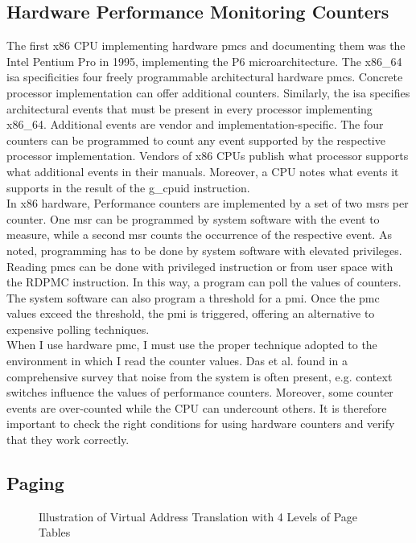 \subsection{Hardware Performance Monitoring Counters}
\label{sec:state:technical:hpc}
The first x86 CPU implementing hardware \glspl{pmc} and
documenting them was the Intel Pentium Pro in 1995, implementing the P6
microarchitecture.\cite{intel_sdm} The x86\_64 \gls{isa} specificities
four freely programmable architectural hardware
\glspl{pmc}.\cite{amd_manual} Concrete processor implementation can offer
additional counters. Similarly, the \gls{isa} specifies architectural
events that must be present in every processor implementing x86\_64. Additional
events are vendor and implementation-specific. The four counters can be
programmed to count any event supported by the respective processor
implementation. Vendors of x86 CPUs publish what processor supports what
additional events in their manuals. Moreover, a CPU notes what events it
supports in the result of the \gls{g_cpuid} instruction. \\

In x86 hardware, Performance counters are implemented by a set of two
\glspl{msr} per counter. One \gls{msr} can be programmed by system software with
the event to measure, while a second \gls{msr} counts the occurrence of the
respective event. As noted, programming has to be done by system software with
elevated privileges. Reading \glspl{pmc} can be done with privileged instruction
or from user space with the RDPMC instruction. In this way, a program can poll
the values of counters. The system software can also program a threshold for a
\gls{pmi}. Once the \gls{pmc} values exceed the threshold, the \gls{pmi} is
triggered, offering an alternative to expensive polling techniques.\\

When I use hardware \gls{pmc}, I must use the proper technique adopted to
the environment in which I read the counter values. Das et al. found in a
comprehensive survey that noise from the system is often present, e.g. context
switches influence the values of performance counters. \cite{das_sok_2019}
Moreover, some counter events are over-counted while the CPU can undercount
others.\cite{weaver_non-determinism_2013} It is therefore important to check the
right conditions for using hardware counters and verify that they work
correctly.

\subsection{Paging}
\label{sec:state:technical:paging}
\begin{center}
    \begin{figure}
        
        \caption{Illustration of Virtual Address Translation with 4 Levels of Page Tables}
        \label{fig:state:technical:paging}
    \end{figure}
\end{center}


